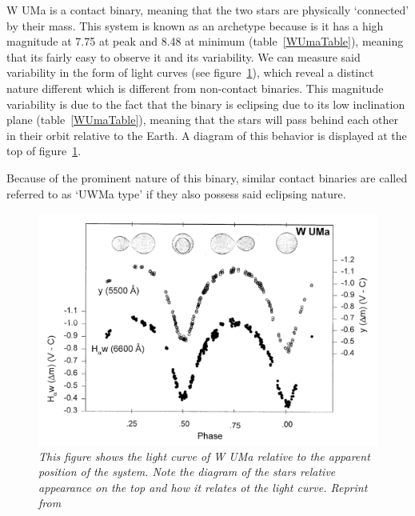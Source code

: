 \documentclass[12pt, a4paper]{article}
\begin{document}
        W UMa is a contact binary, meaning that the two stars are physically `connected' by their mass. This system is known as an archetype because is it has a high magnitude at 7.75 at peak and 8.48 at minimum (table~\ref{WUmaTable}), meaning that its fairly easy to observe it and its variability. We can measure said variability in the form of light curves (see figure~\ref{WUMaLightcruve}), which reveal a distinct nature different which is different from non-contact binaries. This magnitude variability is due to the fact that the binary is eclipsing due to its low inclination plane (table~\ref{WUmaTable}), meaning that the stars will pass behind each other in their orbit relative to the Earth. A diagram of this behavior is displayed at the top of figure~\ref{WUMaLightcruve}.

        Because of the prominent nature of this binary, similar contact binaries are called referred to as `UWMa type' if they also possess said eclipsing nature. 

        \begin{figure}[H]
            \centering
            \includegraphics[width= .9\textwidth]{figs/reused-figs/WUMaLightcurve.png}
            \caption{\textit{This figure shows the light curve of W UMa relative to the apparent position of the system. Note the diagram of the stars relative appearance on the top and how it relates ot the light curve. Reprint from~\parencite{Morgan_1997}}}
            \label{WUMaLightcruve}
        \end{figure}

\end{document}

